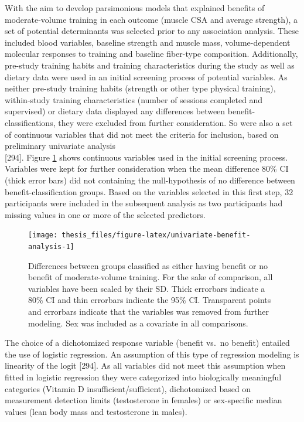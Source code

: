 \documentclass[twoside,10pt]{gihclass} %
\begin{document}
With the aim to develop parsimonious models that explained benefits of moderate-volume training in each outcome (muscle CSA and average strength), a set of potential determinants was selected prior to any association analysis. These included blood variables, baseline strength and muscle mass, volume-dependent molecular responses to training and baseline fiber-type composition. Additionally, pre-study training habits and training characteristics during the study as well as dietary data were used in an initial screening process of potential variables. As neither pre-study training habits (strength or other type physical training), within-study training characteristics (number of sessions completed and supervised) or dietary data displayed any differences between benefit-classifications, they were excluded from further consideration. So were also a set of continuous variables that did not meet the criteria for inclusion, based on preliminary univariate analysis\\
{[}294{]}.
Figure \ref{fig:univariate-benefit-analysis} shows continuous variables used in the initial screening process. Variables were kept for further consideration when the mean difference 80\% CI (thick error bars) did not containing the null-hypothesis of no difference between benefit-classification groups. Based on the variables selected in this first step, 32 participants were included in the subsequent analysis as two participants had missing values in one or more of the selected predictors.
\begin{figure}

{\centering \texttt{[image: thesis\_files/figure-latex/univariate-benefit-analysis-1]} 

}

\caption[Univariate analysis of potential determinants of benefit to moderat- over low-volume training]{Differences between groups classified as either having benefit or no benefit of moderate-volume training. For the sake of comparison, all variables have been scaled by their SD. Thick errorbars indicate a 80\% CI and thin errorbars indicate the 95\% CI. Transparent points and errorbars indicate that the variables was removed from further modeling. Sex was included as a covariate in all comparisons.}\label{fig:univariate-benefit-analysis}
\end{figure}
The choice of a dichotomized response variable (benefit vs.~no benefit) entailed the use of logistic regression. An assumption of this type of regression modeling is linearity of the logit
{[}294{]}.
As all variables did not meet this assumption when fitted in logistic regression they were categorized into biologically meaningful categories (Vitamin D insufficient/sufficient), dichotomized based on measurement detection limits (testosterone in females) or sex-specific median values (lean body mass and testosterone in males).
\end{document}
